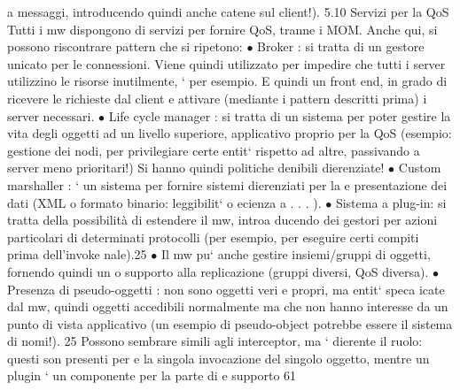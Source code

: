 \documentclass[a4paper,12pt]{article}
\begin{document}
a
messaggi, introducendo quindi anche catene sul client!).
5.10
Servizi per la QoS
Tutti i mw dispongono di servizi per fornire QoS, tranne i MOM. Anche qui, si
possono riscontrare pattern che si ripetono:
$\bullet$ Broker : si tratta di un gestore unicato per le connessioni. Viene quindi
utilizzato per impedire che tutti i server utilizzino le risorse inutilmente,
`
per esempio. E quindi un front end, in grado di ricevere le richieste dal
client e attivare (mediante i pattern descritti prima) i server necessari.
$\bullet$ Life cycle manager : si tratta di un sistema per poter gestire la vita degli
oggetti ad un livello superiore, applicativo proprio per la QoS (esempio:
gestione dei nodi, per privilegiare certe entit` rispetto ad altre, passivando
a
server meno prioritari!) Si hanno quindi politiche denibili dierenziate!
$\bullet$ Custom marshaller : ` un sistema per fornire sistemi dierenziati per la
e
presentazione dei dati (XML o formato binario: leggibilit` o ecienza
a
. . . ).
$\bullet$ Sistema a plug-in: si tratta della possibilità di estendere il mw, introa
ducendo dei gestori per azioni particolari di determinati protocolli (per
esempio, per eseguire certi compiti prima dell'invoke nale).25
$\bullet$ Il mw pu` anche gestire insiemi/gruppi di oggetti, fornendo quindi un
o
supporto alla replicazione (gruppi diversi, QoS diversa).
$\bullet$ Presenza di pseudo-oggetti : non sono oggetti veri e propri, ma entit` speca
icate dal mw, quindi oggetti accedibili normalmente ma che non hanno
interesse da un punto di vista applicativo (un esempio di pseudo-object
potrebbe essere il sistema di nomi!).
25 Possono sembrare simili agli interceptor, ma ` dierente il ruolo: questi son presenti per
e
la singola invocazione del singolo oggetto, mentre un plugin ` un componente per la parte di
e
supporto
61
\end{document}
